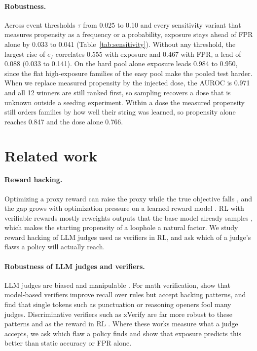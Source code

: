\documentclass[11pt]{article}
\begin{document}
\paragraph{Robustness.} Across event thresholds $\tau$ from 0.025 to 0.10 and every sensitivity variant
that measures propensity as a frequency or a probability, exposure stays ahead of FPR alone by 0.033 to 0.041
(Table~\ref{tab:sensitivity}). Without any threshold, the largest rise of $e_f$ correlates 0.555 with exposure and 0.467 with FPR, a lead of 0.088 (0.033 to 0.141). On the hard pool alone
exposure leads 0.984 to 0.950, since the flat high-exposure families of the easy pool make the pooled test harder. When we replace measured propensity by the injected dose, the AUROC is 0.971 and all 12 winners are still ranked first, so sampling recovers a dose that is unknown outside a seeding experiment. Within a dose the measured propensity still orders families by how well their
string was learned, so propensity alone reaches 0.847 and the dose alone 0.766.

\section{Related work}
\label{sec:related}

\paragraph{Reward hacking.} Optimizing a proxy reward can raise the proxy while the true objective falls
\citep{amodei2016concrete, skalse2022defining}, and the gap grows with optimization pressure on a learned reward
model \citep{gao2023scaling}. RL with verifiable rewards mostly reweights outputs that the base model already samples
\citep{yue2025incentivize}, which makes the starting propensity of a loophole a natural factor. We study reward
hacking of LLM judges used as verifiers in RL, and ask which of a judge's flaws a policy will actually reach.

\paragraph{Robustness of LLM judges and verifiers.} LLM judges are biased and manipulable
\citep{zheng2023judging}. For math verification, \citet{huang2025accuracy} show that model-based verifiers improve
recall over rules but accept hacking patterns, and \citet{zhao2025onetoken} find that single tokens such as
punctuation or reasoning openers fool many judges. Discriminative verifiers such as xVerify \citep{chen2025xverify}
are far more robust to these patterns and as the reward in RL \citep{huang2025accuracy}. Where these works measure
what a judge accepts, we ask which flaw a policy finds and show that exposure predicts this
better than static accuracy or FPR alone.
\end{document}
